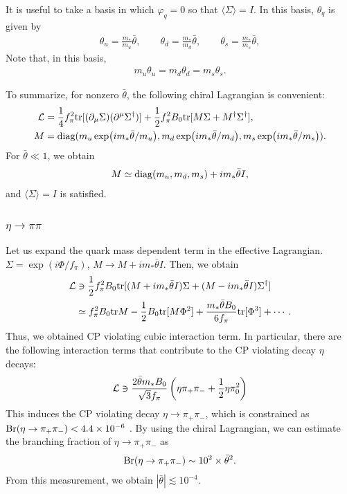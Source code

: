 \documentclass[11pt,a4paper]{article}
\begin{document}
It is useful to take a basis in which $\varphi_q = 0$ so that $\langle \Sigma \rangle = I$. In this basis, $\theta_q$ is given by
\begin{align}
    \theta_u = \frac{m_*}{m_u} \bar\theta, \qquad
    \theta_d = \frac{m_*}{m_d} \bar\theta, \qquad
    \theta_s = \frac{m_*}{m_s} \bar\theta,
\end{align}
Note that, in this basis,
\begin{align}
    m_u \theta_u = m_d \theta_d = m_s \theta_s.
\end{align}

To summarize, for nonzero $\bar\theta$, the following chiral Lagrangian is convenient:
\begin{align}
    {\cal L} &= \frac{1}{4}f_\pi^2 {\rm tr}[(\partial_\mu \Sigma) (\partial^\mu \Sigma^\dagger)] + \frac{1}{2} f_\pi^2 B_0 {\rm tr}[M \Sigma + M^\dagger \Sigma^\dagger], \label{eq:chpt nonzero theta}\\
    M &= {\rm diag}(m_u \exp(im_* \bar\theta/m_u), m_d \exp(im_* \bar\theta/m_d), m_s \exp(im_* \bar\theta/m_s)).
\end{align}
For $\bar\theta \ll 1$, we obtain
\begin{align}
M \simeq {\rm diag}(m_u,m_d,m_s) + i m_* \bar\theta I,
\end{align}
and $\langle \Sigma \rangle = I$ is satisfied.



\subsubsection{$\eta\to\pi\pi$}
Let us expand the quark mass dependent term in the effective Lagrangian.
$\Sigma = \exp\left( i \Phi / f_\pi \right)$, $M \to M + i m_* \bar\theta I$. Then, we obtain \cite{Shifman:1979if,Pich:1991fq,Jarlskog:1995ww}
\begin{align}
    {\cal L}
    &\ni \frac{1}{2} f_\pi^2 B_0 {\rm tr}[(M + i m_* \bar\theta I) \Sigma + (M - i m_* \bar\theta I) \Sigma^\dagger] \nonumber\\
    &\simeq f_\pi^2 B_0 {\rm tr}M - \frac{1}{2} B_0 {\rm tr}[M \Phi^2] + \frac{m_* \bar\theta B_0}{6 f_\pi} {\rm tr}[\Phi^3] + \cdots.
\end{align}
Thus, we obtained CP violating cubic interaction term. In particular, there are the following interaction terms that contribute to the CP violating decay $\eta$ decays:
\begin{align}
{\cal L} \ni \frac{2\bar\theta m_* B_0}{\sqrt{3}f_\pi} \left( \eta \pi_+ \pi_- + \frac{1}{2} \eta \pi_0^2 \right)
\end{align}
This induces the CP violating decay $\eta \to \pi_+ \pi_-$, which is constrained as ${\rm Br}(\eta \to \pi_+ \pi_-) < 4.4 \times 10^{-6}$ \cite{KLOE-2:2020ydi}.
By using the chiral Lagrangian, we can estimate the branching fraction of $\eta \to \pi_+ \pi_-$ as \cite{Jarlskog:1995ww}
\begin{align}
    {\rm Br}(\eta \to \pi_+ \pi_-) \sim 10^2 \times \bar\theta^2.
\end{align}
From this measurement, we obtain $|\bar\theta| \lesssim 10^{-4}$.
\end{document}
